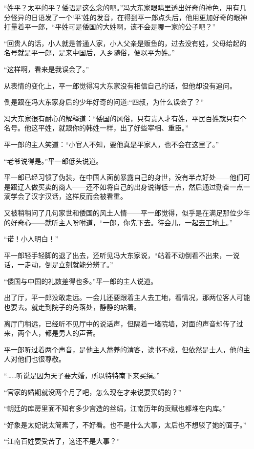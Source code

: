 “姓平？太平的平？倭语是这么念的吧。”冯大东家眼睛里透出好奇的神色，用有几分怪异的日语发了一个‘平’姓的发音，在得到平一郎点头后，他用更加好奇的眼神打量着平一郎，“平姓可是倭国的大姓啊，该不会是哪一家的公子吧？”

“回贵人的话，小人就是普通人家，小人父亲是贩鱼的，过去没有姓，父母给起的名号就是平一郎，是来中国后，入乡随俗，便以平为姓。”

“这样啊，看来是我误会了。”

从表情的变化上，平一郎觉得冯大东家没有相信自己的话，但他却没有追问。

倒是跟在冯大东家身后的少年好奇的问道:“四叔，为什么误会了？”

冯大东家很有耐心的解释道：“倭国的风俗，只有贵人才有姓，平民百姓就只有个名号。他这平姓，就跟你的韩姓一样，出了好些宰相、重臣。”

平一郎的主人笑道：“小官人不知，要他真是平家人，也不会在这里了。”

“老爷说得是。”平一郎低头说道。

平一郎已经习惯了伪装，在中国人面前暴露自己的身世，没有半点好处——他们可是跟辽人做买卖的商人——还不如将自己的出身说得低一点，然后通过勤奋一点一滴学会了汉字汉话，这样反而会被看重。

又被稍稍问了几句家世和倭国的风土人情——平一郎觉得，似乎是在满足那位少年的好奇心——就听主人吩咐道，“一郎，你先下去。待会儿，一起去工地上。”

“诺！小人明白！”

平一郎轻手轻脚的退了出去，还听见冯大东家说，“站着不动倒看不出来，一说话，一走动，倒是立刻就能分辨了。”

“倭国与中国的礼数差得也多。”平一郎的主人说道。

出了厅，平一郎没敢走远。一会儿还要跟着主人去工地，看情况，那两位客人可能也要去。就走到院子的角落处，静静的站着。

离厅门稍远，已经听不见厅中的说话声，但隔着一堵院墙，对面的声音却传了过来，两个人，都是男人的声音。

平一郎听过着两个声音，是他主人蓄养的清客，读书不成，但依然是士人，他的主人对他们也很尊敬。

“……听说是因为天子要大婚，所以特特南下来买绢。”

“官家的婚期就没两个月了吧，怎么现在才来说要买绢的？”

“朝廷的库房里面不知有多少宫造的丝绢，江南历年的贡赋也都堆在内库。”

“好象是太妃说太简素了，不好看。也不是什么大事，太后也不想驳了她的面子。”

“江南百姓要受苦了，这还不是大事？”

